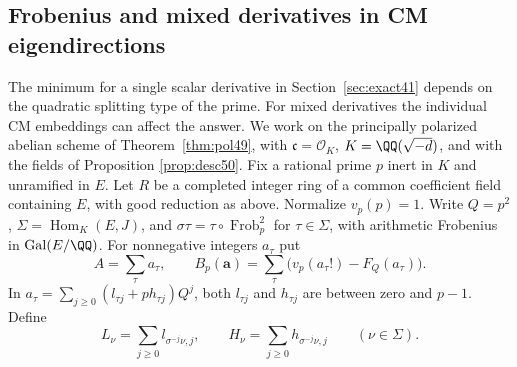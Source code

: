\documentclass[a4paper,11pt]{article}
\theoremstyle{definition}
\theoremstyle{remark}
\newcommand{\Frob}{\operatorname{Frob}}\newcommand{\Gal}{\operatorname{Gal}}
\numberwithin{equation}{section}
\newcommand{\OO}{\mathcal O}
\begin{document}
\subsection{Frobenius and mixed derivatives in CM eigendirections}\label{nav:V-08}
\label{sec:mixed52}

The minimum for a single scalar derivative in Section~\ref{sec:exact41}
depends on the quadratic splitting type of the prime. For mixed
derivatives the individual CM embeddings can affect the answer.
We work on the principally polarized abelian scheme of
Theorem~\ref{thm:pol49}, with \(\mathfrak c=\OO_K\),
\(K=\QQ(\sqrt{-d})\), and with the fields of
Proposition \ref{prop:desc50}.
Fix a rational prime \(p\) inert in \(K\) and unramified in \(E\).
Let \(R\) be a completed integer ring of a common coefficient field
containing \(E\), with good reduction as above. Normalize \(v_p(p)=1\).
Write \(Q=p^2\), \(\Sigma=\operatorname{Hom}_K(E,J)\), and
\(\sigma\tau=\tau\circ\Frob_p^2\) for \(\tau\in\Sigma\), with arithmetic
Frobenius in \(\Gal(E/\QQ)\). For nonnegative integers \(a_\tau\) put
\[
  A=\sum_\tau a_\tau,\qquad
  B_p(\boldsymbol a)=\sum_\tau\bigl(v_p(a_\tau!)-F_Q(a_\tau)\bigr).
\]
In \(a_\tau=\sum_{j\ge0}(l_{\tau j}+p h_{\tau j})Q^j\), both
\(l_{\tau j}\) and \(h_{\tau j}\) are between zero and \(p-1\). Define
\[
      L_\nu=\sum_{j\ge0}l_{\sigma^{-j}\nu,j},\qquad
      H_\nu=\sum_{j\ge0}h_{\sigma^{-j}\nu,j}\qquad(\nu\in\Sigma).
\]
\end{document}
